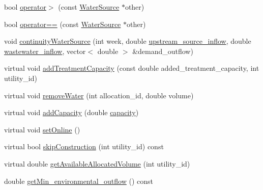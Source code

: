 \begin{DoxyCompactItemize}
\item 
bool \mbox{\hyperlink{classWaterSource_a9db800769891e1f49d74a78298f4dac1_a9db800769891e1f49d74a78298f4dac1}{operator$>$}} (const \mbox{\hyperlink{classWaterSource}{Water\+Source}} $\ast$other)
\item 
bool \mbox{\hyperlink{classWaterSource_af25e06ec954898f3392cb125d2f2c2ad_af25e06ec954898f3392cb125d2f2c2ad}{operator==}} (const \mbox{\hyperlink{classWaterSource}{Water\+Source}} $\ast$other)
\item 
void \mbox{\hyperlink{classWaterSource_a1137cd86f8d3f8a48ebec54282132993_a1137cd86f8d3f8a48ebec54282132993}{continuity\+Water\+Source}} (int week, double \mbox{\hyperlink{classWaterSource_a7a69b2e9b6030f1035e6cf44d2918ee5_a7a69b2e9b6030f1035e6cf44d2918ee5}{upstream\+\_\+source\+\_\+inflow}}, double \mbox{\hyperlink{classWaterSource_aeb5a2d2d83383a70ca20f3e94635a9c7_aeb5a2d2d83383a70ca20f3e94635a9c7}{wastewater\+\_\+inflow}}, vector$<$ double $>$ \&demand\+\_\+outflow)
\item 
virtual void \mbox{\hyperlink{classWaterSource_a210818957f088da4046597d0f1a1340f_a210818957f088da4046597d0f1a1340f}{add\+Treatment\+Capacity}} (const double added\+\_\+treatment\+\_\+capacity, int utility\+\_\+id)
\item 
virtual void \mbox{\hyperlink{classWaterSource_ab697c3a0765d445f72533f6a5f139bd9_ab697c3a0765d445f72533f6a5f139bd9}{remove\+Water}} (int allocation\+\_\+id, double volume)
\item 
virtual void \mbox{\hyperlink{classWaterSource_abffedb6e58620b1b1d6f3c4b4480d3a0_abffedb6e58620b1b1d6f3c4b4480d3a0}{add\+Capacity}} (double \mbox{\hyperlink{classWaterSource_a2ec257b415b248214a8bce7fc5267723_a2ec257b415b248214a8bce7fc5267723}{capacity}})
\item 
virtual void \mbox{\hyperlink{classWaterSource_ab3396e2915db91a6c82e0f29c7889df4_ab3396e2915db91a6c82e0f29c7889df4}{set\+Online}} ()
\item 
virtual bool \mbox{\hyperlink{classWaterSource_ac3105a8ef5470af2e40e7ed74a9be157_ac3105a8ef5470af2e40e7ed74a9be157}{skip\+Construction}} (int utility\+\_\+id) const
\item 
virtual double \mbox{\hyperlink{classWaterSource_a42c687a3be3d88ba38dbea668c8d35cf_a42c687a3be3d88ba38dbea668c8d35cf}{get\+Available\+Allocated\+Volume}} (int utility\+\_\+id)
\item 
double \mbox{\hyperlink{classWaterSource_af7607924825ffe293179b09fe1bc466e_af7607924825ffe293179b09fe1bc466e}{get\+Min\+\_\+environmental\+\_\+outflow}} () const

\end{DoxyCompactItemize}
